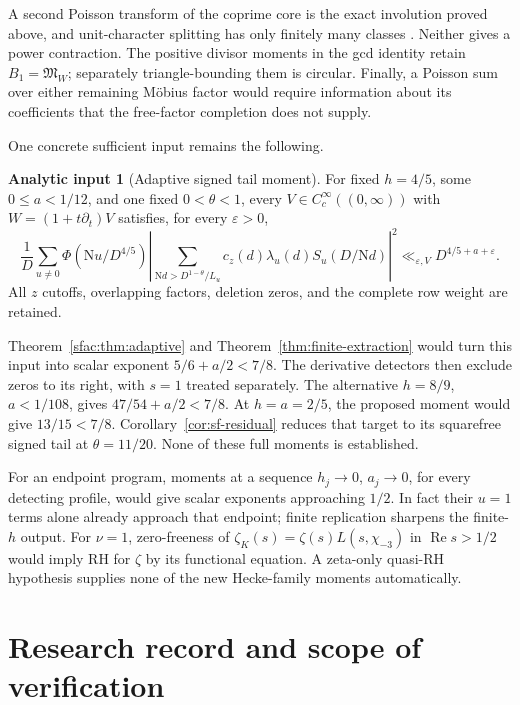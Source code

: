 \documentclass[11pt]{article}
\numberwithin{equation}{section}
\theoremstyle{definition}
\newtheorem{assumption}[theorem]{Analytic input}
\theoremstyle{remark}
\newcommand{\N}{\mathrm N}
\newcommand{\Mfrak}{\mathfrak M}
\newcommand{\eps}{\varepsilon}
\newcommand{\Rea}{\operatorname{Re}}
\begin{document}
A second Poisson transform of the coprime core is the exact involution
proved above, and unit-character splitting has only finitely many
classes \cite{N3}. Neither gives a power contraction.
The positive divisor moments in the gcd identity retain
\(B_1=\Mfrak_W\); separately triangle-bounding them is circular.
Finally, a Poisson sum over either remaining M\"obius factor would
require information about its coefficients that the free-factor
completion does not supply.

One concrete sufficient input remains the following.

\begin{assumption}[Adaptive signed tail moment]\label{input:open-tail}
For fixed \(h=4/5\), some \(0\le a<1/12\), and one fixed
\(0<\theta<1\), every \(V\in C_c^\infty((0,\infty))\) with
\(W=(1+t\partial_t)V\) satisfies, for every \(\eps>0\),
\[
 \frac1D\sum_{u\ne0}\Phi(\N u/D^{4/5})
 \left|\sum_{\N d>D^{1-\theta}/L_u}
     c_z(d)\lambda_u(d)S_u(D/\N d)\right|^2
       \ll_{\eps,V}D^{4/5+a+\eps}.
\]
All \(z\) cutoffs, overlapping factors, deletion zeros, and the
complete row weight are retained.
\end{assumption}

Theorem~\ref{sfac:thm:adaptive} and
Theorem~\ref{thm:finite-extraction} would turn this input into
scalar exponent \(5/6+a/2<7/8\).
The derivative detectors then exclude zeros to its right,
with \(s=1\) treated separately.
The alternative \(h=8/9\), \(a<1/108\), gives
\(47/54+a/2<7/8\).
At \(h=a=2/5\), the proposed moment would give \(13/15<7/8\).
Corollary~\ref{cor:sf-residual} reduces that target to its squarefree
signed tail at \(\theta=11/20\). None of these full moments is
established.

For an endpoint program, moments at a sequence
\(h_j\to0\), \(a_j\to0\), for every detecting profile, would give
scalar exponents approaching \(1/2\).
In fact their \(u=1\) terms alone already approach that endpoint;
finite replication sharpens the finite-\(h\) output.
For \(\nu=1\), zero-freeness of
\(\zeta_K(s)=\zeta(s)L(s,\chi_{-3})\) in \(\Rea s>1/2\)
would imply RH for \(\zeta\) by its functional equation.
A zeta-only quasi-RH hypothesis supplies none of the new
Hecke-family moments automatically.

\appendix
\section{Research record and scope of verification}\label{sec:record}
\end{document}
